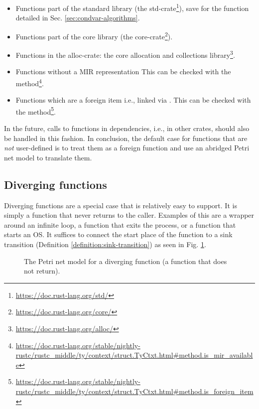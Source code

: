 \begin{itemize}
    \item Functions part of the standard library (the std-crate\footnote{\url{https://doc.rust-lang.org/std/}}),
          save for the  function detailed in Sec. \ref{sec:condvar-algorithms}.
    \item Functions part of the core library (the core-crate\footnote{\url{https://doc.rust-lang.org/core/}}).
    \item Functions in the alloc-crate: the core allocation and collections library\footnote{\url{https://doc.rust-lang.org/alloc/}}.
    \item Functions without a \acrshort{MIR} representation
          This can be checked with the 
          method\footnote{\url{https://doc.rust-lang.org/stable/nightly-rustc/rustc_middle/ty/context/struct.TyCtxt.html\#method.is\_mir\_available}}.
    \item Functions which are a foreign item i.e., linked via .
          This can be checked with the 
          method\footnote{\url{https://doc.rust-lang.org/stable/nightly-rustc/rustc_middle/ty/context/struct.TyCtxt.html\#method.is\_foreign\_item}}.
\end{itemize}

In the future, calls to functions in dependencies, i.e., in other crates, should also be handled in this fashion.
In conclusion, the default case for functions that are \emph{not} user-defined
is to treat them as a foreign function and use an abridged Petri net model to translate them.

\subsection{Diverging functions}

Diverging functions are a special case that is relatively easy to support.
It is simply a function that never returns to the caller.
Examples of this are a wrapper around an infinite  loop,
a function that exits the process,
or a function that starts an \acrshort{OS}.
It suffices to connect the start place of the function to
a sink transition (Definition \ref{definition:sink-transition})
as seen in Fig. \ref{fig:diverging-function}.

\begin{figure}[!htb]
    \centering
    
    \caption{The Petri net model for a diverging function (a function that does not return).}
    \label{fig:diverging-function}
\end{figure}

